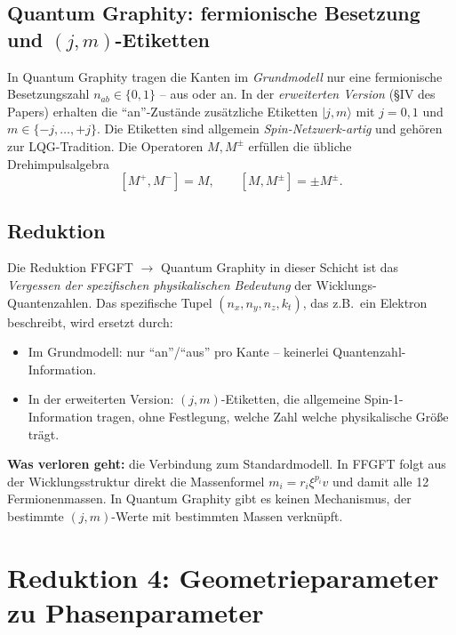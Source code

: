 \subsection{Quantum Graphity: fermionische Besetzung und $(j, m)$-Etiketten}

In Quantum Graphity tragen die Kanten im \emph{Grundmodell} nur eine
fermionische Besetzungszahl $n_{ab} \in \{0, 1\}$ -- aus oder an. In
der \emph{erweiterten Version} (§IV des Papers) erhalten die
\enquote{an}-Zustände zusätzliche Etiketten $|j, m\rangle$ mit
$j = 0, 1$ und $m \in \{-j, \ldots, +j\}$. Die Etiketten sind
allgemein \emph{Spin-Netzwerk-artig} und gehören zur
LQG-Tradition. Die Operatoren $M, M^\pm$ erfüllen die übliche
Drehimpulsalgebra
\[
  [M^+, M^-] = M, \qquad [M, M^\pm] = \pm M^\pm.
\]

\subsection{Reduktion}

Die Reduktion FFGFT $\to$ Quantum Graphity in dieser Schicht ist
das \emph{Vergessen der spezifischen physikalischen Bedeutung} der
Wicklungs-Quantenzahlen. Das spezifische Tupel
$(n_x, n_y, n_z, k_t)$, das z.B.\ ein Elektron beschreibt, wird
ersetzt durch:
\begin{itemize}[leftmargin=2em,itemsep=2pt,topsep=2pt]
  \item Im Grundmodell: nur \enquote{an}/\enquote{aus} pro Kante --
        keinerlei Quantenzahl-Information.
  \item In der erweiterten Version: $(j, m)$-Etiketten, die
        allgemeine Spin-1-Information tragen, ohne Festlegung,
        welche Zahl welche physikalische Größe trägt.
\end{itemize}

\textbf{Was verloren geht:} die Verbindung zum Standardmodell. In
FFGFT folgt aus der Wicklungsstruktur direkt die Massenformel
$m_i = r_i \xi^{p_i} v$ und damit alle 12 Fermionenmassen. In
Quantum Graphity gibt es keinen Mechanismus, der bestimmte
$(j, m)$-Werte mit bestimmten Massen verknüpft.

\section{Reduktion 4: Geometrieparameter zu Phasenparameter}

